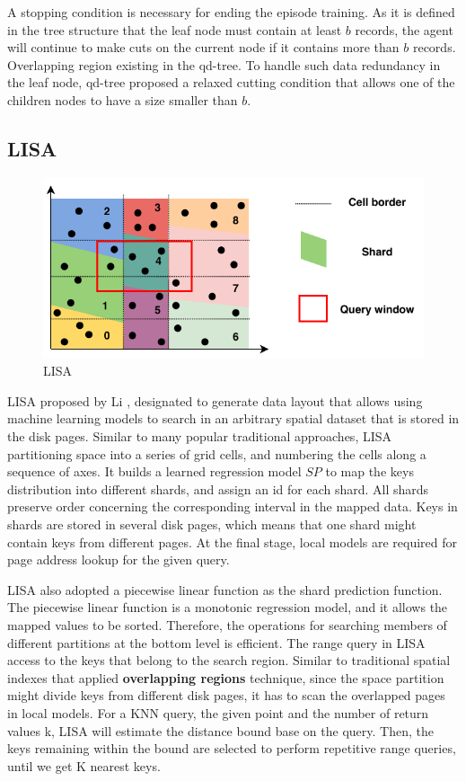 A stopping condition is necessary for ending the episode training. As it is defined in the tree structure that the leaf node must contain at least $b$ records, the agent will continue to make cuts on the current node if it contains more than $b$ records. Overlapping region existing in the qd-tree. To handle such data redundancy in the leaf node, qd-tree proposed a relaxed cutting condition that allows one of the children nodes to have a size smaller than $b$.  


\subsection{LISA}

\begin{figure}[ht]
\centering
\includegraphics[scale=1]{Figures/lisa.pdf}
\caption{LISA}
\label{fig:lisa}
\end{figure}

LISA proposed by Li \cite{Li:2020ki}, designated to generate data layout that allows using machine learning models to search in an arbitrary spatial dataset that is stored in the disk pages. Similar to many popular traditional approaches, LISA partitioning space into a series of grid cells, and numbering the cells along a sequence of axes. It builds a learned regression model $SP$ to map the keys distribution into different shards, and assign an id for each shard. All shards preserve order concerning the corresponding interval in the mapped data. Keys in shards are stored in several disk pages, which means that one shard might contain keys from different pages. At the final stage, local models are required for page address lookup for the given query. 

LISA also adopted a piecewise linear function as the shard prediction function. The piecewise linear function is a monotonic regression model, and it allows the mapped values to be sorted. Therefore, the operations for searching members of different partitions at the bottom level is efficient. The range query in LISA access to the keys that belong to the search region. Similar to traditional spatial indexes that applied \textbf{overlapping regions} technique, since the space partition might divide keys from different disk pages, it has to scan the overlapped pages in local models. For a KNN query, the given point and the number of return values k, LISA will estimate the distance bound base on the query. Then, the keys remaining within the bound are selected to perform repetitive range queries, until we get K nearest keys. 

